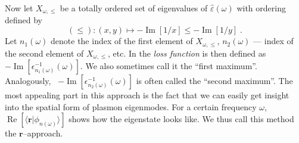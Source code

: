\documentclass[a4paper,12pt]{article}
\begin{document}
    Now let $X_{\omega,\leq}$ be a totally ordered set of eigenvalues of $\hat\varepsilon(\omega)$ with ordering defined by
    \begin{equation*}
        (\leq)\!: (x, y) \mapsto -\operatorname{Im}[1 / x] \leq -\operatorname{Im}[1 / y] \;.
    \end{equation*}
    Let $n_1(\omega)$ denote the index of the first element of $X_{\omega,\leq}$, $n_2(\omega)$ --- index of the second element of $X_{\omega,\leq}$, etc. In \cite{plasmonic2015} the \textit{loss function} is then defined as \ $-\operatorname{Im}[\epsilon_{n_1(\omega)}^{-1}(\omega)]$. We also sometimes call it the ``first maximum''. Analogously, \ $-\operatorname{Im}[\epsilon_{n_2(\omega)}^{-1}(\omega)]$ is often called the ``second maximum''.
    The most appealing part in this approach is the fact that we can easily get insight into the spatial form of plasmon eigenmodes. For a certain frequency $\omega$, \ $\operatorname{Re}[\langle\mathbf{r}|\phi_{n(\omega)}\rangle]$ shows how the eigenstate looks like. We thus call this method the $\mathbf{r}$--approach.
\end{document}
